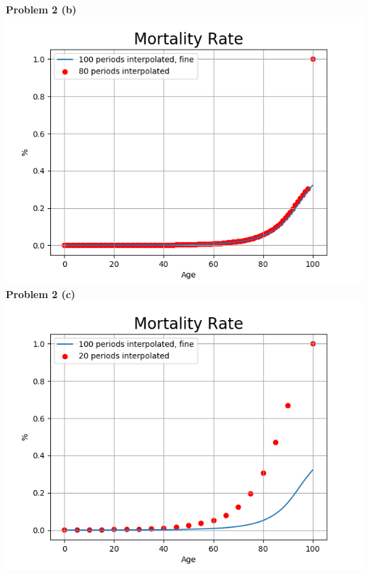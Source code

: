 \documentclass[letterpaper,12pt]{article}
\theoremstyle{definition}
\begin{document}
\noindent\textbf{Problem 2 (b)}\\
\includegraphics[scale=0.5]{images_dem/mort_rate_80.png}
\\

\noindent\textbf{Problem 2 (c)}\\
\includegraphics[scale=0.5]{images_dem/mort_rate_20.png}
\\
\end{document}
